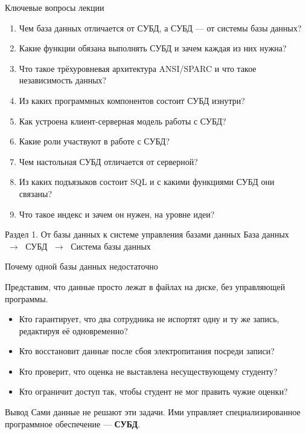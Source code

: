 \documentclass[aspectratio=169]{beamer}
\begin{document}
\begin{frame}{Ключевые вопросы лекции}

\small
\begin{enumerate}
  \item Чем база данных отличается от СУБД, а СУБД — от системы базы данных?
  \item Какие функции обязана выполнять СУБД и зачем каждая из них нужна?
  \item Что такое трёхуровневая архитектура ANSI/SPARC и что такое независимость данных?
  \item Из каких программных компонентов состоит СУБД изнутри?
  \item Как устроена клиент-серверная модель работы с СУБД?
  \item Какие роли участвуют в работе с СУБД?
  \item Чем настольная СУБД отличается от серверной?
  \item Из каких подъязыков состоит SQL и с какими функциями СУБД они связаны?
  \item Что такое индекс и зачем он нужен, на уровне идеи?
\end{enumerate}

\end{frame}



\begin{frame}{Раздел 1. От базы данных к системе управления базами данных}
\centering
\Large
База данных $\;\rightarrow\;$ СУБД $\;\rightarrow\;$ Система базы данных
\end{frame}


\begin{frame}{Почему одной базы данных недостаточно}

Представим, что данные просто лежат в файлах на диске,
без управляющей программы.

\vspace{0.3cm}

\begin{itemize}
  \item Кто гарантирует, что два сотрудника не испортят
        одну и ту же запись, редактируя её одновременно?
  \item Кто восстановит данные после сбоя электропитания
        посреди записи?
  \item Кто проверит, что оценка не выставлена
        несуществующему студенту?
  \item Кто ограничит доступ так, чтобы студент не мог
        править чужие оценки?
\end{itemize}

\vspace{0.3cm}

\begin{alertblock}{Вывод}
Сами данные не решают эти задачи. Ими управляет
специализированное программное обеспечение — \textbf{СУБД}.
\end{alertblock}

\end{frame}
\end{document}
